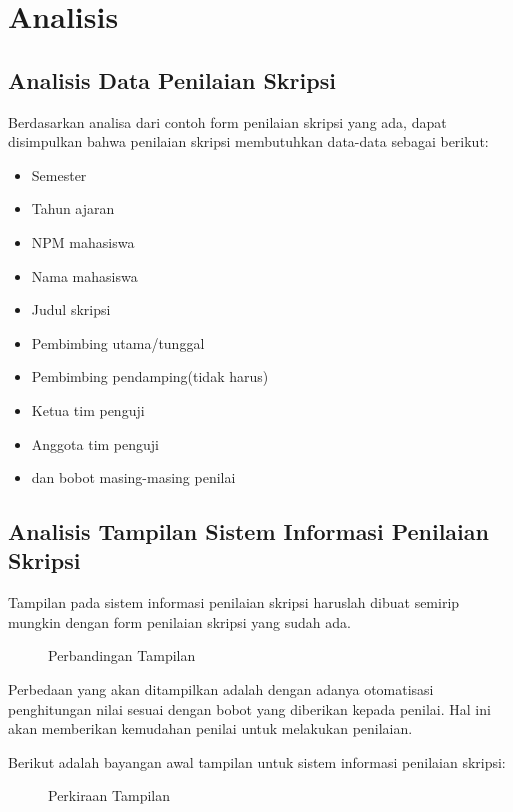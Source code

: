 \chapter{Analisis}
\label{chap: analisis}

\section{Analisis Data Penilaian Skripsi}
\label{sec: analisisData}

	Berdasarkan analisa dari contoh form penilaian skripsi yang ada, dapat disimpulkan bahwa penilaian skripsi membutuhkan data-data sebagai berikut:
		
		\begin{itemize}
			\item Semester
			\item Tahun ajaran
			\item NPM mahasiswa 
			\item Nama mahasiswa
			\item Judul skripsi
			\item Pembimbing utama/tunggal
			\item Pembimbing pendamping(tidak harus)
			\item Ketua tim penguji
			\item Anggota tim penguji
			\item dan bobot masing-masing penilai
		\end{itemize}
	
\section{Analisis Tampilan Sistem Informasi Penilaian Skripsi}
\label{sec: analisisTampilan}
	
	Tampilan pada sistem informasi penilaian skripsi haruslah dibuat semirip mungkin dengan form penilaian skripsi yang sudah ada.
		
	\begin{figure}[]
		\centering
		\caption{Perbandingan Tampilan \cite{presentasi}}
		\label{fig:tampilan}
	\end{figure}
	
	Perbedaan yang akan ditampilkan adalah dengan adanya otomatisasi penghitungan nilai sesuai dengan bobot yang diberikan kepada penilai. Hal ini akan memberikan kemudahan penilai untuk melakukan penilaian.
	
	Berikut adalah bayangan awal tampilan untuk sistem informasi penilaian skripsi:
	\begin{figure}[]
		\centering
		\caption{Perkiraan Tampilan \cite{presentasi}}
		\label{fig:tampilan1}
	\end{figure}
	